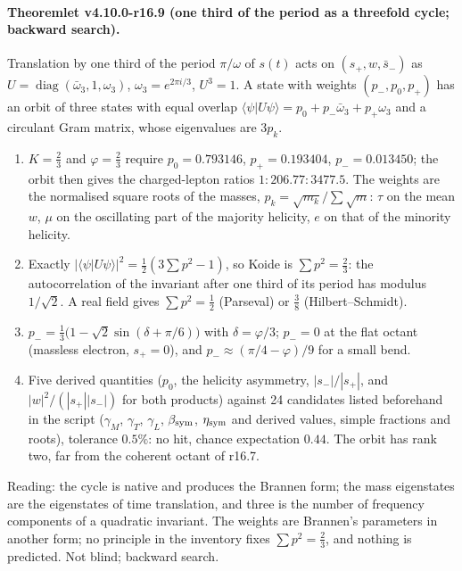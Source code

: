 \paragraph{Theoremlet v4.10.0-r16.9 (one third of the period as a threefold cycle; backward search).}
Translation by one third of the period \(\pi/\omega\) of \(s(t)\) acts on \((s_+,w,\bar s_-)\) as \(U=\operatorname{diag}(\bar\omega_3,1,\omega_3)\),
\(\omega_3=e^{2\pi i/3}\), \(U^3=1\).  A state with weights \((p_-,p_0,p_+)\) has an orbit of three states with equal overlap
\(\langle\psi|U\psi\rangle=p_0+p_-\bar\omega_3+p_+\omega_3\) and a circulant Gram matrix, whose eigenvalues are \(3p_k\).
\begin{enumerate}[leftmargin=2em]
\item[(a)] \(K=\tfrac23\) and \(\varphi=\tfrac23\) require \(p_0=0.793146\), \(p_+=0.193404\), \(p_-=0.013450\); the orbit then gives the charged-lepton
ratios \(1:206.77:3477.5\).  The weights are the normalised square roots of the masses, \(p_k=\sqrt{m_k}/\sum\sqrt m\): \(\tau\) on the mean
\(w\), \(\mu\) on the oscillating part of the majority helicity, \(e\) on that of the minority helicity.
\item[(b)] Exactly \(|\langle\psi|U\psi\rangle|^2=\tfrac12(3\sum p^2-1)\), so Koide is \(\sum p^2=\tfrac23\): the autocorrelation of the invariant
after one third of its period has modulus \(1/\sqrt2\).  A real field gives \(\sum p^2=\tfrac12\) (Parseval) or \(\tfrac38\) (Hilbert--Schmidt).
\item[(c)] \(p_-=\tfrac13\bigl(1-\sqrt2\sin(\delta+\pi/6)\bigr)\) with \(\delta=\varphi/3\); \(p_-=0\) at the flat octant (massless electron, \(s_+=0\)), and
\(p_-\approx(\pi/4-\varphi)/9\) for a small bend.
\item[(d)] Five derived quantities (\(p_0\), the helicity asymmetry, \(|s_-|/|s_+|\), and \(|w|^2/(|s_+||s_-|)\) for both products) against 24
candidates listed beforehand in the script (\(\gamma_M\), \(\gamma_T\), \(\gamma_L\), \(\beta_{\rm sym}\), \(\eta_{\rm sym}\) and derived values, simple fractions
and roots), tolerance \(0.5\%\): no hit, chance expectation \(0.44\).  The orbit has rank two, far from the coherent octant of r16.7.
\end{enumerate}
Reading: the cycle is native and produces the Brannen form; the mass eigenstates are the eigenstates of time translation,
and three is the number of frequency components of a quadratic invariant.  The weights are Brannen's parameters in another
form; no principle in the inventory fixes \(\sum p^2=\tfrac23\), and nothing is predicted.  Not blind; backward search.

